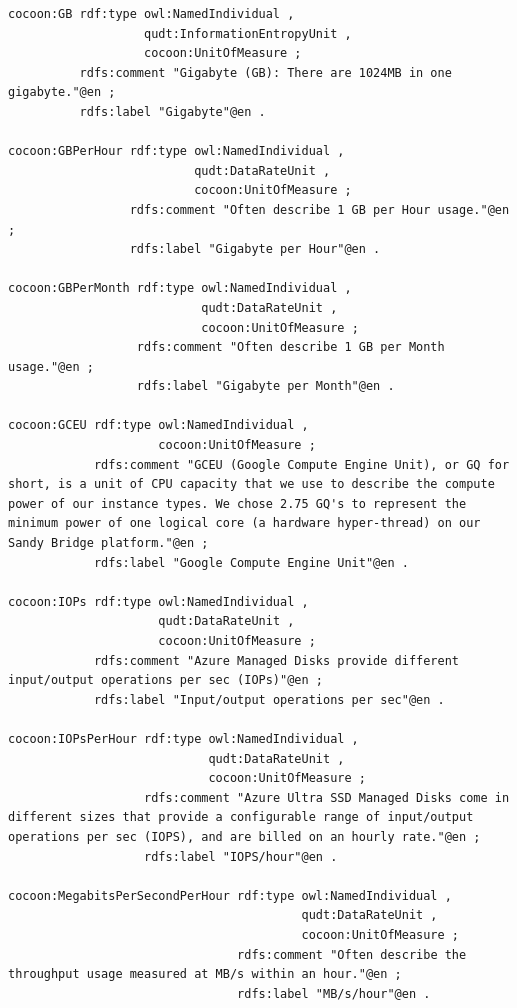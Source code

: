 \begin{lstlisting}[caption={Units},label={lst:units}]
cocoon:GB rdf:type owl:NamedIndividual ,
                   qudt:InformationEntropyUnit ,
                   cocoon:UnitOfMeasure ;
          rdfs:comment "Gigabyte (GB): There are 1024MB in one gigabyte."@en ;
          rdfs:label "Gigabyte"@en .

cocoon:GBPerHour rdf:type owl:NamedIndividual ,
                          qudt:DataRateUnit ,
                          cocoon:UnitOfMeasure ;
                 rdfs:comment "Often describe 1 GB per Hour usage."@en ;
                 rdfs:label "Gigabyte per Hour"@en .

cocoon:GBPerMonth rdf:type owl:NamedIndividual ,
                           qudt:DataRateUnit ,
                           cocoon:UnitOfMeasure ;
                  rdfs:comment "Often describe 1 GB per Month usage."@en ;
                  rdfs:label "Gigabyte per Month"@en .

cocoon:GCEU rdf:type owl:NamedIndividual ,
                     cocoon:UnitOfMeasure ;
            rdfs:comment "GCEU (Google Compute Engine Unit), or GQ for short, is a unit of CPU capacity that we use to describe the compute power of our instance types. We chose 2.75 GQ's to represent the minimum power of one logical core (a hardware hyper-thread) on our Sandy Bridge platform."@en ;
            rdfs:label "Google Compute Engine Unit"@en .

cocoon:IOPs rdf:type owl:NamedIndividual ,
                     qudt:DataRateUnit ,
                     cocoon:UnitOfMeasure ;
            rdfs:comment "Azure Managed Disks provide different input/output operations per sec (IOPs)"@en ;
            rdfs:label "Input/output operations per sec"@en .

cocoon:IOPsPerHour rdf:type owl:NamedIndividual ,
                            qudt:DataRateUnit ,
                            cocoon:UnitOfMeasure ;
                   rdfs:comment "Azure Ultra SSD Managed Disks come in different sizes that provide a configurable range of input/output operations per sec (IOPS), and are billed on an hourly rate."@en ;
                   rdfs:label "IOPS/hour"@en .

cocoon:MegabitsPerSecondPerHour rdf:type owl:NamedIndividual ,
                                         qudt:DataRateUnit ,
                                         cocoon:UnitOfMeasure ;
                                rdfs:comment "Often describe the throughput usage measured at MB/s within an hour."@en ;
                                rdfs:label "MB/s/hour"@en .


\end{lstlisting}
